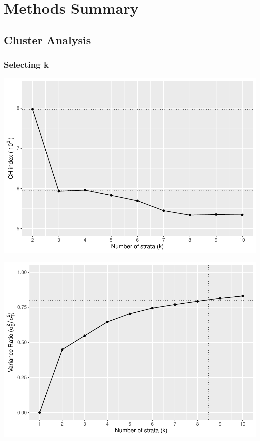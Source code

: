 \documentclass[
  man,floatsintext]{apa6}
\begin{document}
\hypertarget{methods-summary}{%
\section{Methods Summary}\label{methods-summary}}

\hypertarget{cluster-analysis}{%
\subsection{Cluster Analysis}\label{cluster-analysis}}

\hypertarget{selecting-k}{%
\subsubsection{Selecting k}\label{selecting-k}}

\includegraphics{5---Analysis_files/figure-latex/unnamed-chunk-5-1.pdf}

\includegraphics{5---Analysis_files/figure-latex/unnamed-chunk-6-1.pdf}
\end{document}
